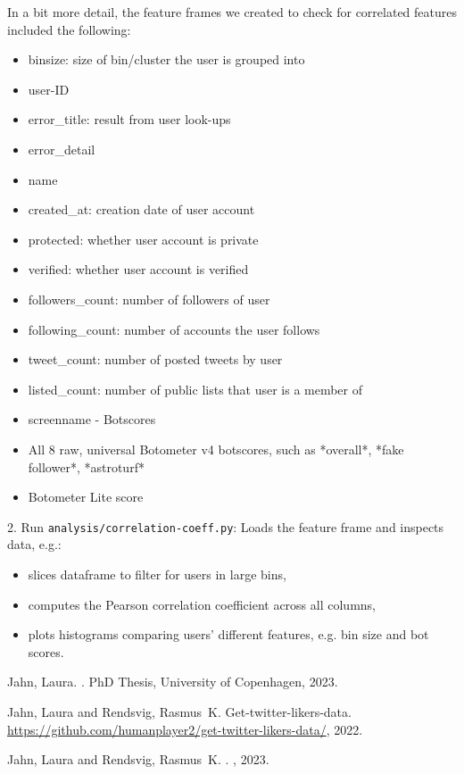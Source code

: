 \documentclass[10pt,english,sigconf,authoryear,nonacm]{article}
\begin{document}
In a bit more detail, the feature frames we created to check for correlated
features included the following:
\begin{itemize}
\item binsize: size of bin/cluster the user is grouped into
\item user-ID
\item error\_title: result from user look-ups
\item error\_detail
\item name
\item created\_at: creation date of user account
\item protected: whether user account is private
\item verified: whether user account is verified
\item followers\_count: number of followers of user
\item following\_count: number of accounts the user follows
\item tweet\_count: number of posted tweets by user
\item listed\_count: number of public lists that user is a member of
\item screenname - Botscores
\item All 8 raw, universal Botometer v4 botscores, such as {*}overall{*},
{*}fake follower{*}, {*}astroturf{*}
\item Botometer Lite score
\end{itemize}
2. Run \texttt{analysis/correlation-coeff.py}: Loads the feature frame
and inspects data, e.g.:
\begin{itemize}
\item slices dataframe to filter for users in large bins,
\item computes the Pearson correlation coefficient across all columns,
\item plots histograms comparing users' different features, e.g. bin size
and bot scores.
\end{itemize}
\begin{thebibliography}{1}

	{Jahn, Laura}.
	.
	\newblock PhD Thesis, University of Copenhagen, 2023.
	
	{Jahn, Laura and Rendsvig, Rasmus~K.}
	\newblock Get-twitter-likers-data.
	\newblock \url{https://github.com/humanplayer2/get-twitter-likers-data/}, 2022.
	
	{Jahn, Laura and Rendsvig, Rasmus~K.}
	.
	, 2023.
	
	\end{thebibliography}
	
\end{document}
